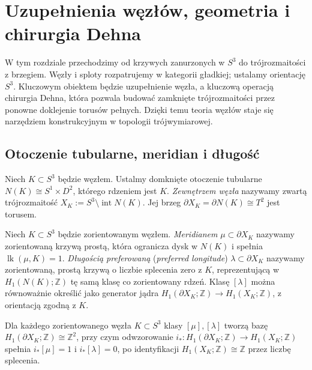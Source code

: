 \chapter{Uzupełnienia węzłów, geometria i chirurgia Dehna}
\label{ch:kt-chirurgia-3d}

W tym rozdziale przechodzimy od krzywych zanurzonych w $S^3$ do
trójrozmaitości z brzegiem. Węzły i sploty rozpatrujemy
w kategorii gładkiej; ustalamy orientację $S^3$.
Kluczowym obiektem będzie uzupełnienie
węzła, a kluczową operacją chirurgia Dehna, która pozwala budować
zamknięte trójrozmaitości przez ponowne doklejenie torusów pełnych.
Dzięki temu teoria węzłów staje się narzędziem konstrukcyjnym
w topologii trójwymiarowej.

\section{Otoczenie tubularne, meridian i długość}
\label{sec:kt-peryferia}

\begin{definicja}
Niech $K\subset S^3$ będzie węzłem. Ustalmy domknięte otoczenie
tubularne $N(K)\cong S^1\times D^2$, którego rdzeniem jest $K$.
\emph{Zewnętrzem węzła} nazywamy zwartą trójrozmaitość
$X_K:=S^3\setminus\operatorname{int}N(K)$. Jej brzeg
$\partial X_K=\partial N(K)\cong T^2$ jest torusem.
\end{definicja}

\begin{definicja}
Niech $K\subset S^3$ będzie zorientowanym węzłem.
\emph{Meridianem} $\mu\subset\partial X_K$ nazywamy
zorientowaną krzywą prostą, która ogranicza dysk
w $N(K)$ i spełnia $\operatorname{lk}(\mu,K)=1$.
\emph{Długością preferowaną} (\emph{preferred longitude})
$\lambda\subset\partial X_K$ nazywamy zorientowaną,
prostą krzywą o liczbie splecenia zero z $K$, reprezentującą
w $H_1(N(K);\mathbb Z)$ tę samą klasę co zorientowany rdzeń.
Klasę $[\lambda]$ można równoważnie określić jako generator
jądra $H_1(\partial X_K;\mathbb Z)\to H_1(X_K;\mathbb Z)$,
z orientacją zgodną z $K$.
\end{definicja}

\begin{stwierdzenie}
\label{prop:kt-peripheral-homology}
Dla każdego zorientowanego węzła $K\subset S^3$ klasy
$[\mu],[\lambda]$ tworzą bazę $H_1(\partial X_K;\mathbb Z)
\cong\mathbb Z^2$, przy czym odwzorowanie
$i_*\colon H_1(\partial X_K;\mathbb Z)\to H_1(X_K;\mathbb Z)$
spełnia $i_*[\mu]=1$ i $i_*[\lambda]=0$, po identyfikacji
$H_1(X_K;\mathbb Z)\cong\mathbb Z$ przez liczbę splecenia.
\end{stwierdzenie}

